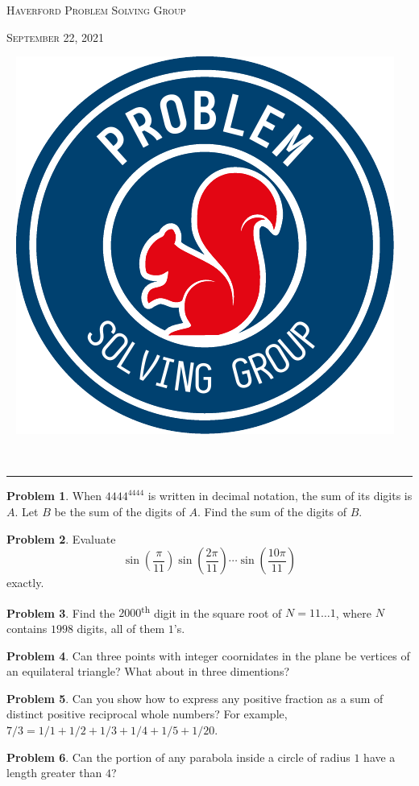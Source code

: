 \documentclass{scrartcl}
\theoremstyle{definition}
\newtheorem{prob}{Problem}
\begin{document}
	\begin{minipage}{.6\textwidth}{}
		\textsc{Haverford Problem Solving Group}

		\textsc{September 22, 2021}
	\end{minipage}
	\begin{minipage}{.4\textwidth}{}
		\ \hfill
		\includegraphics[height = .9in]{psg_logo}
	\end{minipage}\\[1em]

	\hrule

	\begin{prob}
		When \(4444^{4444}\) is written in decimal notation, the sum of its digits is \(A\).  Let \(B\) be the sum of the digits of \(A\). Find the sum of the digits of \(B\).
	\end{prob}

	\begin{prob}
		Evaluate \[ \sin\left(\frac{\pi}{11}\right) \sin\left(\frac{2\pi}{11}\right) \cdots \sin\left(\frac{10\pi}{11}\right) \]exactly.
	\end{prob}

	\begin{prob}
		Find the $2000$\textsuperscript{th} digit in the square root of $N = 11\dots1$, where $N$ contains $1998$ digits, all of them $1$'s.
	\end{prob}

	\begin{prob}
		Can three points with integer coornidates in the plane be vertices of an equilateral triangle? What about in three dimentions?
	\end{prob}

	\begin{prob}
		Can you show how to express any positive fraction as a sum of distinct positive reciprocal whole numbers? For example, $7/3 = 1/1 + 1/2 + 1/3 + 1/4 + 1/5 + 1/20$.
	\end{prob}

	\begin{prob}
		Can the portion of any parabola inside a circle of radius \(1\) have a length greater than \(4\)?
	\end{prob}

	\vfill
\end{document}
